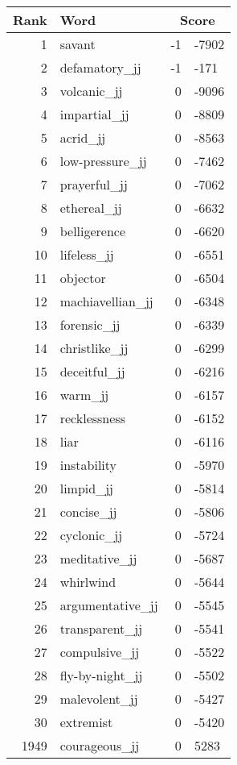 \begin{longtable}[!htbp]{| rlr@{.}l |}
    \hline
    \textbf{Rank} & \textbf{Word} & \multicolumn{2}{c|}{\textbf{Score}} \\
    \hline
    \endhead
    1 & savant & -1 & -7902 \\
    2 & defamatory\_jj & -1 & -171 \\
    3 & volcanic\_jj & 0 & -9096 \\
    4 & impartial\_jj & 0 & -8809 \\
    5 & acrid\_jj & 0 & -8563 \\
    6 & low-pressure\_jj & 0 & -7462 \\
    7 & prayerful\_jj & 0 & -7062 \\
    8 & ethereal\_jj & 0 & -6632 \\
    9 & belligerence & 0 & -6620 \\
    10 & lifeless\_jj & 0 & -6551 \\
    11 & objector & 0 & -6504 \\
    12 & machiavellian\_jj & 0 & -6348 \\
    13 & forensic\_jj & 0 & -6339 \\
    14 & christlike\_jj & 0 & -6299 \\
    15 & deceitful\_jj & 0 & -6216 \\
    16 & warm\_jj & 0 & -6157 \\
    17 & recklessness & 0 & -6152 \\
    18 & liar & 0 & -6116 \\
    19 & instability & 0 & -5970 \\
    20 & limpid\_jj & 0 & -5814 \\
    21 & concise\_jj & 0 & -5806 \\
    22 & cyclonic\_jj & 0 & -5724 \\
    23 & meditative\_jj & 0 & -5687 \\
    24 & whirlwind & 0 & -5644 \\
    25 & argumentative\_jj & 0 & -5545 \\
    26 & transparent\_jj & 0 & -5541 \\
    27 & compulsive\_jj & 0 & -5522 \\
    28 & fly-by-night\_jj & 0 & -5502 \\
    29 & malevolent\_jj & 0 & -5427 \\
    30 & extremist & 0 & -5420 \\
    1949 & courageous\_jj & 0 & 5283 \\

\end{longtable}
